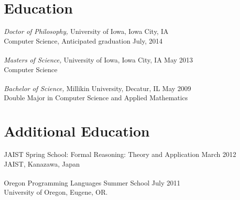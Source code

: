 \documentclass[line,margin]{res}
\begin{document}

\address{104 Westside Dr. Apt. 10, Iowa City, IA 52246}
\address{(217) 358-6999 harley-eades@uiowa.edu}

 
\begin{resume}
 
 
  \section{\small Education} 
          {\sl Doctor of Philosophy,} University of Iowa, Iowa City, IA \hfill \\
	  Computer Science, Anticipated graduation July, 2014\\
          \ \\
	  {\sl Masters of Science,} University of Iowa, Iowa City, IA \hfill May 2013 \\
	  Computer Science\\
          \ \\
          {\sl Bachelor of Science,} Millikin University, Decatur, IL \hfill May 2009 \\
	  Double Major in Computer Science and Applied Mathematics\\
		
  \section{\small Additional Education} 
         JAIST Spring School: Formal Reasoning: Theory and Application \hfill March 2012 \\
         JAIST, Kanazawa, Japan\\
         \ \\
         Oregon Programming Languages Summer School \hfill July 2011\\
         University of Oregon, Eugene, OR.                  


\end{resume}
\end{document}
